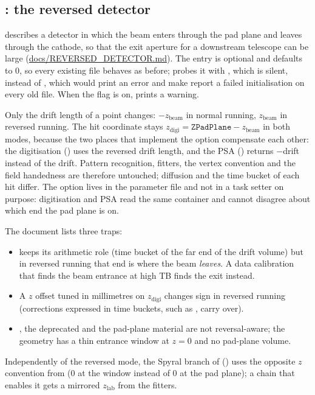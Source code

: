 \subsection{: the reversed detector}
\label{sec:par-reverse}

 describes a detector in which the beam enters through the pad plane and
leaves through the cathode, so that the exit aperture for a downstream telescope can be large
(\url{docs/REVERSED_DETECTOR.md}). The entry is optional and defaults to 0, so every existing file
behaves as before;  probes it with , which is silent,
instead of , which would print an error and make  report a failed
initialisation on every old file. When the flag is on,  prints a warning.

Only the drift length of a point changes: $-z_\mathrm{beam}$ in normal running,
$z_\mathrm{beam}$ in reversed running. The hit coordinate stays
$z_\mathrm{digi} = \mathtt{ZPadPlane} - z_\mathrm{beam}$ in both modes, because the two places that
implement the option compensate each other: the digitisation
(\allowbreak{}) uses the reversed drift length, and
the PSA () returns $-$drift instead of the
drift. Pattern recognition, fitters, the vertex convention and the field handedness are therefore
untouched; diffusion and the time bucket of each hit differ. The option lives in the parameter file
and not in a task setter on purpose: digitisation and PSA read the same container and cannot disagree
about which end the pad plane is on.

The document lists three traps:
\begin{itemize}
  \item {} keeps its arithmetic role (time bucket of the far end of the drift volume)
    but in reversed running that end is where the beam \emph{leaves}. A data calibration that finds the
    beam entrance at high TB finds the exit instead.
  \item A $z$ offset tuned in millimetres on $z_\mathrm{digi}$ changes sign in reversed running
    (corrections expressed in time buckets, such as , carry over).
  \item {}, the deprecated  and the pad-plane material
    are not reversal-aware; the geometry has a thin entrance window at $z=0$ and no pad-plane volume.
\end{itemize}
Independently of the reversed mode, the Spyral branch of 
() uses the opposite $z$ convention from  (0 at the window
instead of 0 at the pad plane); a chain that enables it gets a mirrored $z_\mathrm{lab}$ from the
fitters.

